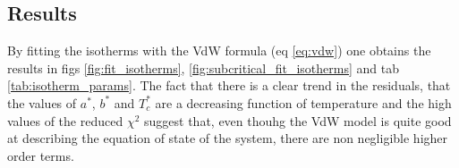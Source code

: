 \documentclass[a4paper, 11pt]{article}
\begin{document}
  \subsection{Results}
    By fitting the isotherms with the VdW formula (eq \ref{eq:vdw}) one obtains the results in figs \ref{fig:fit_isotherms}, \ref{fig:subcritical_fit_isotherms} and tab \ref{tab:isotherm_params}.
    The fact that there is a clear trend in the residuals, that the values of $a^*$, $b^*$ and $T_c^*$ are a decreasing function of temperature and the  high values of the reduced $\chi^2$ suggest that, even thouhg the VdW model is quite good at describing the equation of state of the system, there are non negligible higher order terms. \\
\end{document}
